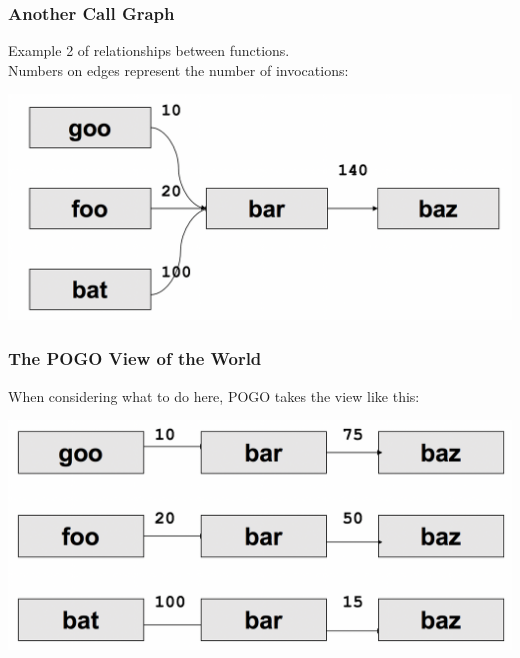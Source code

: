 \begin{frame}
\frametitle{Another Call Graph}

\large
Example 2 of relationships between functions.\\
Numbers on edges represent the number of invocations:

\begin{center}
	\includegraphics[width=\textwidth]{images/callpaths2.png}
\end{center}

\end{frame}



\begin{frame}
\frametitle{The POGO View of the World}
\large
When considering what to do here, POGO takes the view like this:

\begin{center}
	\includegraphics[width=\textwidth]{images/callpaths3.png}
\end{center}

\end{frame}



